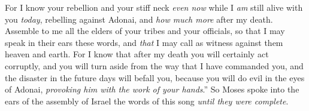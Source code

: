 \begin{biblechapter}
\verse For I know your rebellion and your stiff neck \textit{even now} while I \textit{am} still alive with you \textit{today}, rebelling against Adonai, and \textit{how much more} after my death.
\verse Assemble to me all the elders of your tribes and your officials, so that I may speak in their ears these words, and \textit{that} I may call as witness against them heaven and earth.
\verse For I know that after my death you will certainly act corruptly, and you will turn aside from the way that I have commanded you, and the disaster in the future days will befall you, because you will do evil in the eyes of Adonai, \textit{provoking him with the work of your hands}.”
\verse So Moses spoke into the ears of the assembly of Israel the words of this song \textit{until they were complete}.
\end{biblechapter}


